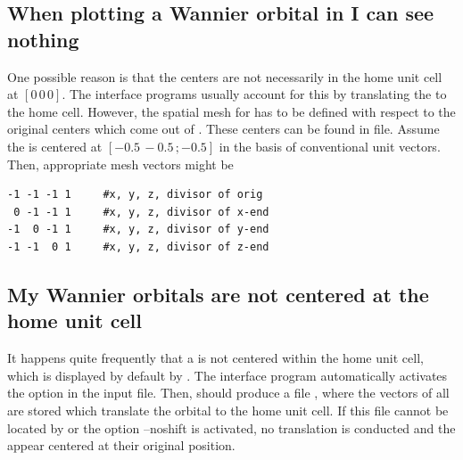 \subsection{When plotting a Wannier orbital in \xcrys I can see nothing}
One possible reason is that the \wf centers are not necessarily in the
home unit cell at $[0\, 0\, 0]$.  The interface programs usually
account for this by translating the \wf to the home cell.  However, the
spatial mesh for \wplot has to be defined with respect to the original
centers which come out of \wannier.  These centers can be found in
 file.  Assume the \wf is centered at $[-0.5\, -0.5\,;
-0.5]$ in the basis of conventional unit vectors. Then, appropriate
mesh vectors might be
\begin{Verbatim}
-1 -1 -1 1     #x, y, z, divisor of orig
 0 -1 -1 1     #x, y, z, divisor of x-end
-1  0 -1 1     #x, y, z, divisor of y-end
-1 -1  0 1     #x, y, z, divisor of z-end
\end{Verbatim}

\subsection{My Wannier orbitals are not centered at the home unit
  cell}

It happens quite frequently that a \wf is not centered within the home
unit cell, which is displayed by default by \xcrys. The interface
program \writewin automatically activates the option
 in the \wannier input file. Then,
\wannier should produce a file , where the
vectors of all \wf are stored which translate the orbital to the home
unit cell. If this file cannot be located by \wplottoxsf or the option
--noshift is activated, no translation is conducted and the \wf appear
centered at their original position.


